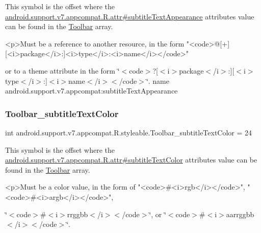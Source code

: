 This symbol is the offset where the \hyperlink{classandroid_1_1support_1_1v7_1_1appcompat_1_1R_1_1attr_af922e4bc81d4e0f520259565bba0d869}{android.\+support.\+v7.\+appcompat.\+R.\+attr\#subtitle\+Text\+Appearance} attribute\textquotesingle{}s value can be found in the \hyperlink{classandroid_1_1support_1_1v7_1_1appcompat_1_1R_1_1styleable_a2daba9587ef9f700f2d54cf13435cb32}{Toolbar} array.

\begin{DoxyVerb}      <p>Must be a reference to another resource, in the form "<code>@[+][<i>package</i>:]<i>type</i>:<i>name</i></code>"
\end{DoxyVerb}
 or to a theme attribute in the form \char`\"{}$<$code$>$?\mbox{[}$<$i$>$package$<$/i$>$\+:\mbox{]}\mbox{[}$<$i$>$type$<$/i$>$\+:\mbox{]}$<$i$>$name$<$/i$>$$<$/code$>$\char`\"{}.  name android.\+support.\+v7.\+appcompat\+:subtitle\+Text\+Appearance \mbox{\label{classandroid_1_1support_1_1v7_1_1appcompat_1_1R_1_1styleable_a0d191ed721e0d27dabbefa262648c353}} 
\subsubsection{\texorpdfstring{Toolbar\+\_\+subtitle\+Text\+Color}{Toolbar\_subtitleTextColor}}
{\footnotesize\ttfamily int android.\+support.\+v7.\+appcompat.\+R.\+styleable.\+Toolbar\+\_\+subtitle\+Text\+Color = 24\hspace{0.3cm}{\ttfamily [static]}}

This symbol is the offset where the \hyperlink{classandroid_1_1support_1_1v7_1_1appcompat_1_1R_1_1attr_aa13ebb30d6c238f765d0bf427fec0c76}{android.\+support.\+v7.\+appcompat.\+R.\+attr\#subtitle\+Text\+Color} attribute\textquotesingle{}s value can be found in the \hyperlink{classandroid_1_1support_1_1v7_1_1appcompat_1_1R_1_1styleable_a2daba9587ef9f700f2d54cf13435cb32}{Toolbar} array.

\begin{DoxyVerb}      <p>Must be a color value, in the form of "<code>#<i>rgb</i></code>", "<code>#<i>argb</i></code>",
\end{DoxyVerb}
 \char`\"{}$<$code$>$\#$<$i$>$rrggbb$<$/i$>$$<$/code$>$\char`\"{}, or \char`\"{}$<$code$>$\#$<$i$>$aarrggbb$<$/i$>$$<$/code$>$\char`\"{}. 


